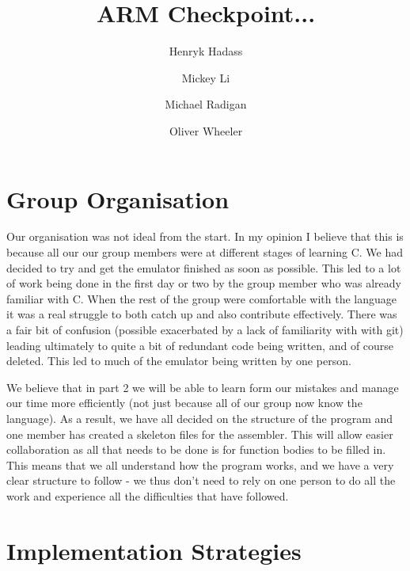 \documentclass[11pt]{article}
\begin{document}
\title{ARM Checkpoint... }
\author{Henryk Hadass \and Mickey Li \and Michael Radigan \and Oliver Wheeler}
\maketitle

\section{Group Organisation}

Our organisation was not ideal from the start. In my opinion I believe that this is because all our our group members were at different stages of learning C. We had decided to try and get the emulator finished as soon as possible. This led to a lot of work being done in the first day or two by the group member who was already familiar with C. When the rest of the group were comfortable with the language it was a real struggle to both catch up and also contribute effectively. There was a fair bit of confusion (possible exacerbated by a lack of familiarity with with git) leading ultimately to quite a bit of redundant code being written, and of course deleted. This led to much of the emulator being written by one person.

We believe that in part 2 we will be able to learn form our mistakes and manage our time more efficiently (not just because all of our group now know the language). As a result, we have all decided on the structure of the program and one member has created a skeleton files for the assembler. This will allow easier collaboration as all that needs to be done is for function bodies to be filled in. This means that we all understand how the program works, and we have a very clear structure to follow - we thus don't need to rely on one person to do all the work and experience all the difficulties that have followed.



\section{Implementation Strategies}
\end{document}
